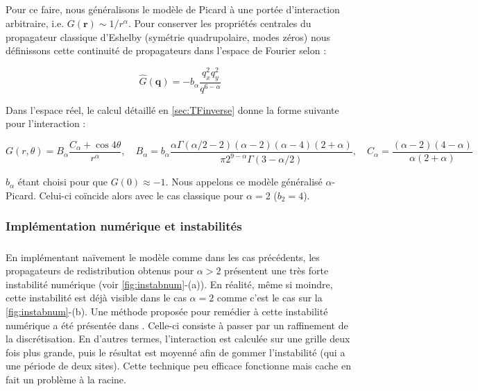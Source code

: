 \subparagraph{}Pour ce faire, nous généralisons le modèle de Picard à une portée d'interaction arbitraire, i.e. $G(\mathbf{r})\sim 1/r^\alpha$. Pour conserver les propriétés centrales du propagateur classique d'Eshelby (symétrie quadrupolaire, modes zéros) nous définissons cette continuité de propagateurs dans l'espace de Fourier selon :

\begin{equation}
	\hat{G}(\mathbf{q}) = -b_\alpha \frac{q_x^2 q_y^2}{q^{6-\alpha}}
\end{equation}

\noindent Dans l'espace réel, le calcul détaillé en \autoref{sec:TFinverse} donne la forme suivante pour l'interaction :

\begin{equation}
    G(r, \theta) = B_\alpha\frac{C_\alpha+\cos 4\theta}{r^\alpha}, \quad B_\alpha = b_\alpha\frac{\alpha\Gamma(\alpha/2-2)(\alpha-2)(\alpha-4)(2+\alpha)}{\pi 2^{9-\alpha}\Gamma(3-\alpha/2)},\quad C_\alpha = \frac{(\alpha-2)(4-\alpha)}{\alpha (2+\alpha)}
    \label{eq:RealAlphaPicard}
\end{equation}

\noindent $b_\alpha$ étant choisi pour que $G(0)\approx-1$. Nous appelons ce modèle généralisé $\alpha$-Picard. Celui-ci coïncide alors avec le cas classique pour $\alpha=2$ ($b_2 = 4$).

\subsubsection{Implémentation numérique et instabilités}

\subparagraph{}En implémentant naïvement le modèle comme dans les cas précédents, les propagateurs de redistribution obtenus pour $\alpha>2$ présentent une très forte instabilité numérique (voir \autoref{fig:instabnum}-(a)). En réalité, même si moindre, cette instabilité est déjà visible dans le cas $\alpha=2$ comme c'est le cas sur la \autoref{fig:instabnum}-(b). Une méthode proposée pour remédier à cette instabilité numérique a été présentée dans \cite{nicolas_ecoulements_2014}. Celle-ci consiste à passer par un raffinement de la discrétisation. En d'autres termes, l'interaction est calculée sur une grille deux fois plus grande, puis le résultat est moyenné afin de gommer l'instabilité (qui a une période de deux sites). Cette technique peu efficace fonctionne mais cache en fait un problème à la racine. 

